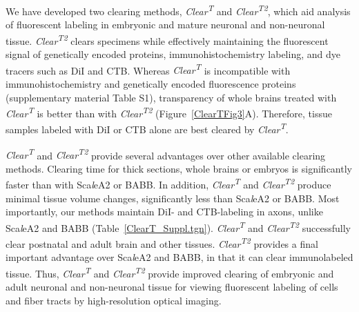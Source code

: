 We have developed two clearing methods, \emph{Clear\textsuperscript{T}} and \emph{Clear\textsuperscript{T2}}, which aid analysis of fluorescent labeling in embryonic and mature neuronal and non-neuronal tissue.
\emph{Clear\textsuperscript{T2}} clears specimens while effectively maintaining the fluorescent signal of genetically encoded proteins, immunohistochemistry labeling, and dye tracers such as DiI and CTB.
Whereas \emph{Clear\textsuperscript{T}} is incompatible with immunohistochemistry and genetically encoded fluorescence proteins (supplementary material Table S1), transparency of whole brains treated with \emph{Clear\textsuperscript{T}} is better than with \emph{Clear\textsuperscript{T2}} (Figure~\ref{ClearTFig3}A).
Therefore, tissue samples labeled with DiI or CTB alone are best cleared by \emph{Clear\textsuperscript{T}}.

\emph{Clear\textsuperscript{T}} and \emph{Clear\textsuperscript{T2}} provide several advantages over other available clearing methods.
Clearing time for thick sections, whole brains or embryos is significantly faster than with Sca\emph{l}eA2 or BABB.
In addition, \emph{Clear\textsuperscript{T}} and \emph{Clear\textsuperscript{T2}} produce minimal tissue volume changes, significantly less than Sca\emph{l}eA2 or BABB.
Most importantly, our methods maintain DiI- and CTB-labeling in axons, unlike Sca\emph{l}eA2 and BABB (Table~\ref{ClearT_Suppl.tgn}).
\emph{Clear\textsuperscript{T}} and \emph{Clear\textsuperscript{T2}} successfully clear postnatal and adult brain and other tissues.
\emph{Clear\textsuperscript{T2}} provides a final important advantage over Sca\emph{l}eA2 and BABB, in that it can clear immunolabeled tissue.
Thus, \emph{Clear\textsuperscript{T}} and \emph{Clear\textsuperscript{T2}} provide improved clearing of embryonic and adult neuronal and non-neuronal tissue for viewing fluorescent labeling of cells and fiber tracts by high-resolution optical imaging.

